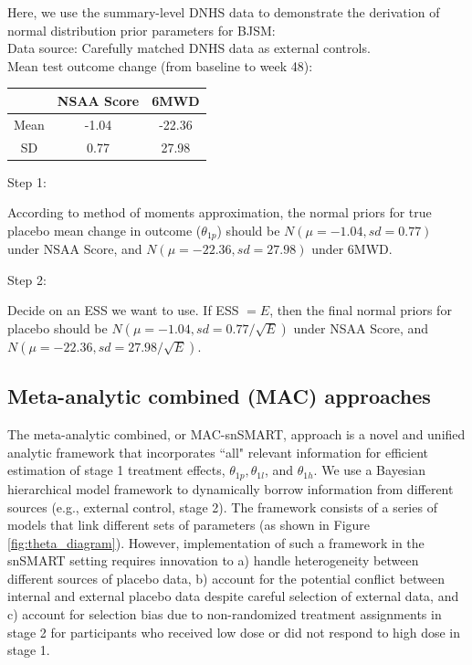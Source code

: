 Here, we use the summary-level \ac{DNHS} data to demonstrate the derivation of normal distribution prior parameters for BJSM:\\

\noindent Data source: Carefully matched \ac{DNHS} data as external controls.  \\
Mean test outcome change (from baseline to week 48):

\begin{center}
\begin{tabular}{ccc}
\hline
& NSAA Score & 6MWD \\
\hline
Mean & -1.04 & -22.36 \\
SD & 0.77 & 27.98 \\
\hline
\end{tabular}
\end{center}

\noindent Step 1: 

According to method of moments approximation, the normal priors for true placebo mean change in outcome ($\theta_{1p}$) should be $N(\mu = -1.04, sd = 0.77)$ under \ac{NSAA} Score, and $N(\mu = -22.36, sd = 27.98)$ under \ac{6MWD}.

\noindent Step 2: 

Decide on an \ac{ESS} we want to use. If \ac{ESS} $= E$, then the final normal priors for placebo should be $N(\mu = -1.04, sd = 0.77/\sqrt{E})$ under \ac{NSAA} Score, and $N(\mu = -22.36, sd = 27.98/\sqrt{E})$.
\subsection{Meta-analytic combined (MAC) approaches}

The meta-analytic combined, or MAC-snSMART, approach is a novel and unified analytic framework that incorporates ``all" relevant information for efficient estimation of stage 1 treatment effects, $\theta_{1p}, \theta_{1l}$, and $\theta_{1h}$. We use a Bayesian hierarchical model framework to dynamically borrow information from different sources (e.g., external control, stage 2). The framework consists of a series of models that link different sets of parameters (as shown in Figure \ref{fig:theta_diagram}). However, implementation of such a framework in the \ac{snSMART} setting requires innovation to a) handle heterogeneity between different sources of placebo data, b) account for the potential conflict between internal and external placebo data despite careful selection of external data, and c) account for selection bias due to non-randomized treatment assignments in stage 2 for participants who received low dose or did not respond to high dose in stage 1.

